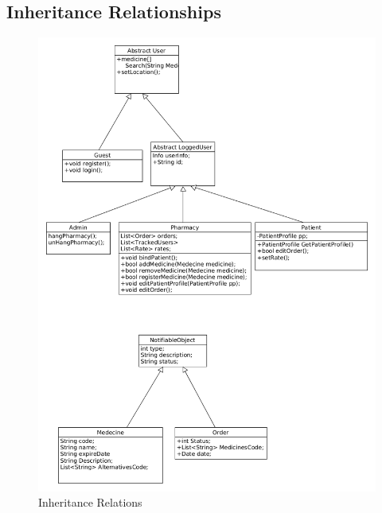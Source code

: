 \documentclass[]{article}
\begin{document}
\subsection{Inheritance Relationships}
\begin{figure}[H]
\centering
\includegraphics[scale=0.4]{./classdiagram/InhertanceRelations}
\caption{Inheritance Relations}
\end{figure}
\end{document}
